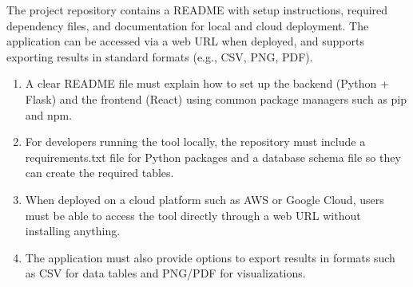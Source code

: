 \documentclass[12pt]{article}
\begin{document}
The project repository contains a README with setup instructions, required dependency files, and documentation for local and cloud deployment. The application can be accessed via a web URL when deployed, and supports exporting results in standard formats (e.g., CSV, PNG, PDF).
\begin{enumerate}[label=OE-PR\arabic*]
\item A clear README file must explain how to set up the backend (Python + Flask) and the frontend (React) using common package managers such as pip and npm.
\item For developers running the tool locally, the repository must include a requirements.txt file for Python packages and a database schema file so they can create the required tables.
\item When deployed on a cloud platform such as AWS or Google Cloud, users must be able to access the tool directly through a web URL without installing anything.
\item The application must also provide options to export results in formats such as CSV for data tables and PNG/PDF for visualizations.
\end{enumerate}
\end{document}
